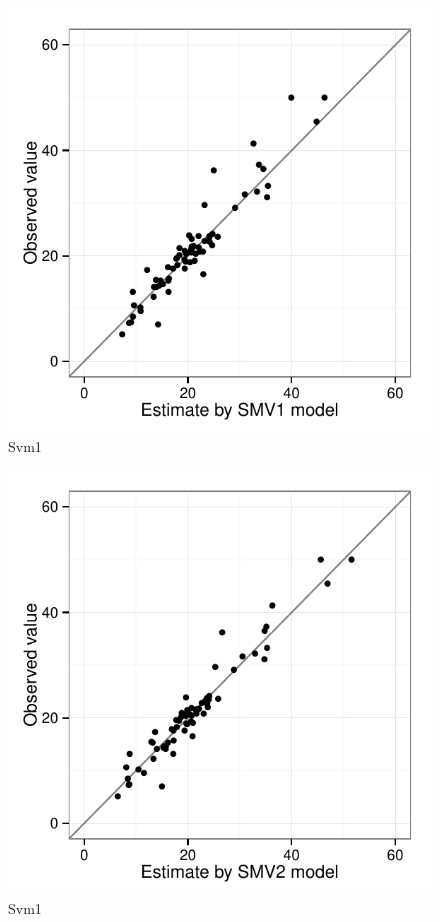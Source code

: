 \documentclass[10pt, letterpaper ]{article}
\begin{document}
\begin{minipage}{0.49\textwidth}
	\begin{figure}[H]
		\centering
		\includegraphics[width=\textwidth]{figures/smv1.pdf}
		\caption{Svm1}
	\end{figure}
\end{minipage}
\begin{minipage}{0.49\textwidth}
	\begin{figure}[H]
		\centering
		\includegraphics[width=\textwidth]{figures/smv2.pdf}
		\caption{Svm1}
	\end{figure}
\end{minipage}
\end{document}
